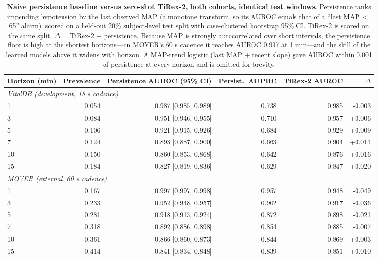 \begin{table}[ht]
\centering\footnotesize
\caption{\textbf{Naive persistence baseline versus zero-shot TiRex-2, both cohorts, identical test windows.} Persistence ranks impending hypotension by the last observed MAP (a monotone transform, so its AUROC equals that of a ``last MAP\,$<$\,65'' alarm); scored on a held-out 20\% subject-level test split with case-clustered bootstrap 95\% CI. TiRex-2 is scored on the same split. $\Delta$ = TiRex-2 $-$ persistence. Because MAP is strongly autocorrelated over short intervals, the persistence floor is high at the shortest horizons---on MOVER's 60 s cadence it reaches AUROC 0.997 at 1 min---and the skill of the learned models above it widens with horizon. A MAP-trend logistic (last MAP + recent slope) gave AUROC within 0.001 of persistence at every horizon and is omitted for brevity.}
\label{tab:naive}
\begin{tabular}{lrrrrr}
\toprule
Horizon (min) & Prevalence & Persistence AUROC (95\% CI) & Persist.\ AUPRC & TiRex-2 AUROC & $\Delta$ \\
\midrule
\multicolumn{6}{l}{\textit{VitalDB (development, 15 s cadence)}}\\
1 & 0.054 & 0.987 [0.985, 0.989] & 0.738 & 0.985 & -0.003 \\
3 & 0.084 & 0.951 [0.946, 0.955] & 0.710 & 0.957 & +0.006 \\
5 & 0.106 & 0.921 [0.915, 0.926] & 0.684 & 0.929 & +0.009 \\
7 & 0.124 & 0.893 [0.887, 0.900] & 0.663 & 0.904 & +0.011 \\
10 & 0.150 & 0.860 [0.853, 0.868] & 0.642 & 0.876 & +0.016 \\
15 & 0.184 & 0.827 [0.819, 0.836] & 0.629 & 0.847 & +0.020 \\
\midrule
\multicolumn{6}{l}{\textit{MOVER (external, 60 s cadence)}}\\
1 & 0.167 & 0.997 [0.997, 0.998] & 0.957 & 0.948 & -0.049 \\
3 & 0.233 & 0.952 [0.948, 0.957] & 0.902 & 0.917 & -0.036 \\
5 & 0.281 & 0.918 [0.913, 0.924] & 0.872 & 0.898 & -0.021 \\
7 & 0.318 & 0.892 [0.886, 0.898] & 0.854 & 0.885 & -0.007 \\
10 & 0.361 & 0.866 [0.860, 0.873] & 0.844 & 0.869 & +0.003 \\
15 & 0.414 & 0.841 [0.834, 0.848] & 0.839 & 0.851 & +0.010 \\
\bottomrule
\end{tabular}
\end{table}

